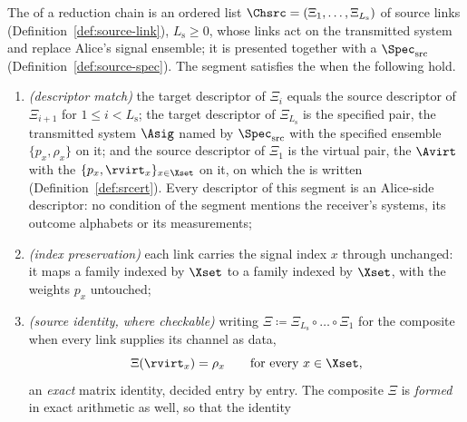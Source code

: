 \begin{definition}
\label{def:source-segment}
The  of a reduction chain is an ordered list
$\Chsrc=(\Xi_1,\dots,\Xi_{L_{\mathrm s}})$ of source links
(Definition~\ref{def:source-link}), $L_{\mathrm s}\ge0$, whose links act on
the transmitted system and replace Alice's signal ensemble; it is presented
together with a  $\Spec_{\mathrm{src}}$
(Definition~\ref{def:source-spec}). The segment satisfies the
 when the following hold.
\begin{enumerate}[label=(S\arabic*),leftmargin=3.0em]
\item \emph{(descriptor match)} the target descriptor of $\Xi_i$ equals the
source descriptor of $\Xi_{i+1}$ for $1\le i<L_{\mathrm s}$; the target
descriptor of $\Xi_{L_{\mathrm s}}$ is the specified pair, the transmitted
system $\Asig$ named by $\Spec_{\mathrm{src}}$ with the specified ensemble
$\{p_x,\rho_x\}$ on it; and the source descriptor of $\Xi_1$ is the virtual
pair, the  $\Avirt$ with the
 $\{p_x,\rvirt_x\}_{x\in\Xset}$ on it, on which the
 is written (Definition~\ref{def:srcert}).
Every descriptor of
this segment is an Alice-side descriptor: no condition of the segment
mentions the receiver's systems, its outcome alphabets or its measurements;
\item \emph{(index preservation)} each link carries the signal index $x$
through unchanged: it maps a family indexed by $\Xset$ to a family indexed
by $\Xset$, with the weights $p_x$ untouched;
\item \emph{(source identity, where checkable)} writing
$\Xi\coloneqq\Xi_{L_{\mathrm s}}\circ\dots\circ\Xi_1$ for the composite
when every link supplies its channel as data,
\begin{equation}\label{eq:srcmap}
  \Xi(\rvirt_x)=\rho_x\qquad\text{for every }x\in\Xset ,
\end{equation}
an \emph{exact} matrix identity, decided entry by entry. The composite
$\Xi$ is \emph{formed} in exact arithmetic as well, so that the identity

\end{enumerate}
\end{definition}
